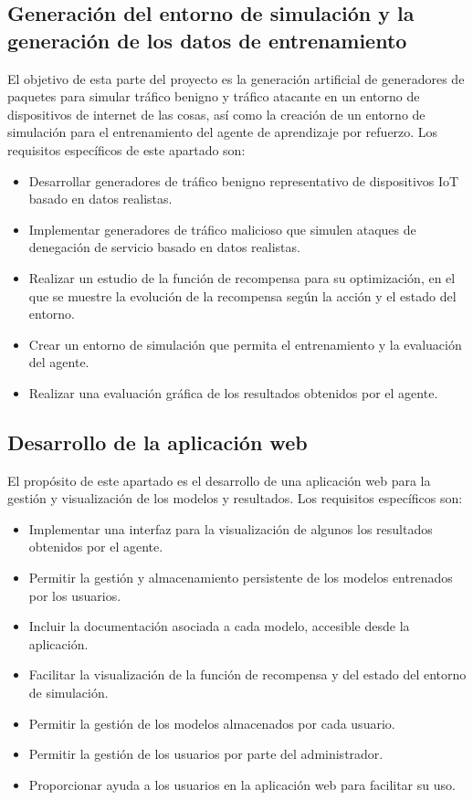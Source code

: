 \subsection{Generación del entorno de simulación y la generación de los datos de entrenamiento}
El objetivo de esta parte del proyecto es la generación artificial de generadores de paquetes para simular tráfico benigno y tráfico atacante en un entorno de dispositivos de internet de las cosas, así como la creación de un entorno de simulación para el entrenamiento del agente de aprendizaje por refuerzo. Los requisitos específicos de este apartado son:
\begin{itemize}
    \item Desarrollar generadores de tráfico benigno representativo de dispositivos IoT basado en datos realistas.
    \item Implementar generadores de tráfico malicioso que simulen ataques de denegación de servicio basado en datos realistas.
    \item Realizar un estudio de la función de recompensa para su optimización, en el que se muestre la evolución de la recompensa según la acción y el estado del entorno.
    \item Crear un entorno de simulación que permita el entrenamiento y la evaluación del agente.
    \item Realizar una evaluación gráfica de los resultados obtenidos por el agente.
\end{itemize}

\subsection{Desarrollo de la aplicación web}
El propósito de este apartado es el desarrollo de una aplicación web para la gestión y visualización de los modelos y resultados. Los requisitos específicos son:
\begin{itemize}
    \item Implementar una interfaz para la visualización de algunos los resultados obtenidos por el agente.
    \item Permitir la gestión y almacenamiento persistente de los modelos entrenados por los usuarios.
    \item Incluir la documentación asociada a cada modelo, accesible desde la aplicación.
    \item Facilitar la visualización de la función de recompensa y del estado del entorno de simulación.
    \item Permitir la gestión de los modelos almacenados por cada usuario.
    \item Permitir la gestión de los usuarios por parte del administrador.
    \item Proporcionar ayuda a los usuarios en la aplicación web para facilitar su uso.
\end{itemize}

